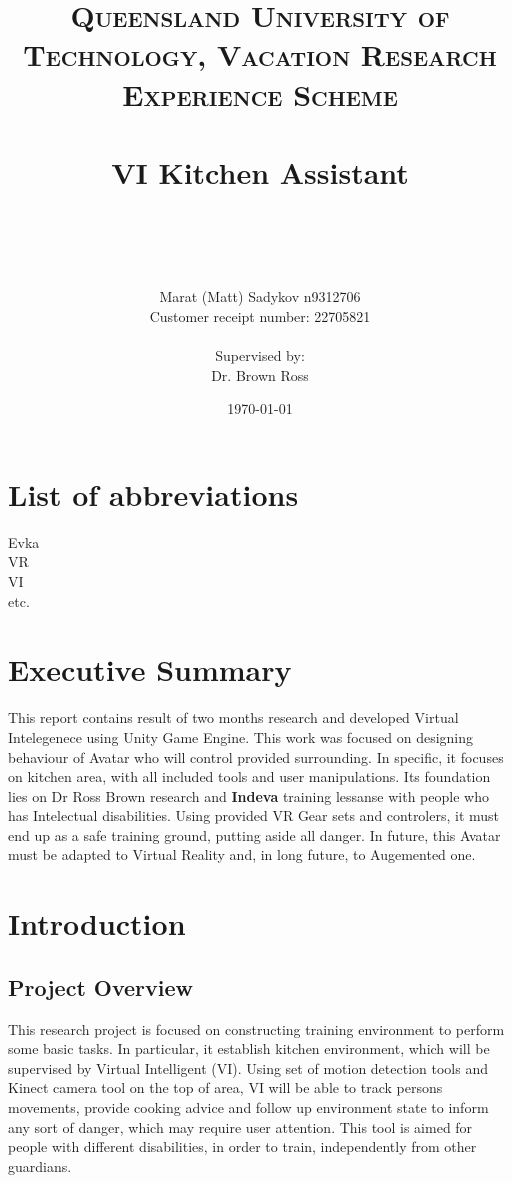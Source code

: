 \documentclass[18pt]{article}
\title{	
	\normalfont \normalsize 
	\textsc{Queensland University of Technology, Vacation Research Experience Scheme} \\ [25pt] 
	\horrule{0.5pt} \\[0.4cm] %
	\huge VI Kitchen Assistant \\ %
	\author{Marat (Matt) Sadykov \small n9312706 \\  Customer receipt number: \small 22705821 \\ \\ Supervised by: \\ Dr. Brown Ross \\ }
	\date{\normalsize\today} %
	\horrule{2pt} \\[0.5cm] %
}
\numberwithin{equation}{section} %
\numberwithin{figure}{section} %
\numberwithin{table}{section} %
\begin{document}
\maketitle
\newpage
\renewcommand*\contentsname{Table of Contents}
\tableofcontents
\listoffigures
\section{List of abbreviations}
	Evka \\
	VR \\
	VI \\
	etc.
\newpage	
\section{Executive Summary}
	This report contains result of two months research and developed Virtual Intelegenece using Unity Game Engine. This work was focused on designing behaviour of Avatar who will control provided surrounding. In specific, it focuses on kitchen area, with all included tools and user manipulations. Its foundation lies on Dr Ross Brown research and \textbf{Indeva} training lessanse with people who has Intelectual disabilities. Using provided VR Gear sets and controlers, it must end up as a safe training ground, putting aside all danger. In future, this Avatar must be adapted to Virtual Reality and, in long future, to Augemented one.
\section{Introduction}
\subsection{Project Overview}
	This research project is focused on constructing training environment to perform some basic tasks. In particular, it establish kitchen environment, which will be supervised by Virtual Intelligent (VI). Using set of motion detection tools and Kinect camera tool on the top of area, VI will be able to track persons movements, provide cooking advice and follow up environment state to inform any sort of danger, which may require user attention. This tool is aimed for people with different disabilities, in order to train, independently from other guardians. \\
		
\end{document}
